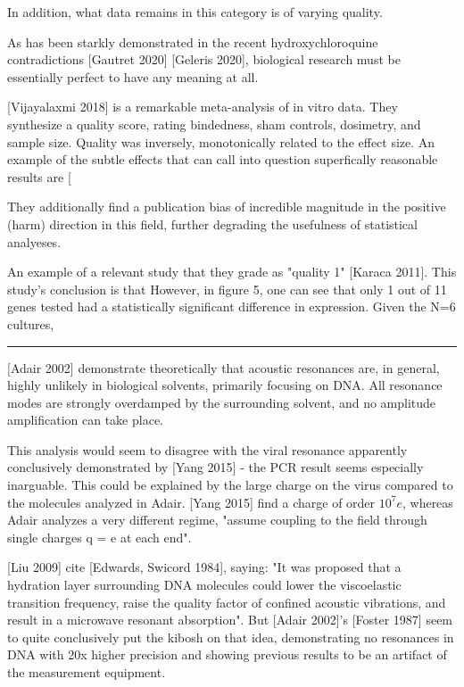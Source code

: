\documentclass[fleqn,10pt]{article}
\begin{document}
\begin{multicols}{1}
In addition, what data remains in this category is of varying quality. 

As has been starkly demonstrated in the recent hydroxychloroquine contradictions [Gautret 2020] [Geleris 2020], biological research must be essentially perfect to have any meaning at all.

[Vijayalaxmi 2018] is a remarkable meta-analysis of in vitro data. They synthesize a quality score, rating bindedness, sham controls, dosimetry, and sample size. Quality was inversely, monotonically related to the effect size. An example of the subtle effects that can call into question superfically reasonable results are [

They additionally find a publication bias of incredible magnitude in the positive (harm) direction in this field, further degrading the usefulness of statistical analyeses.

An example of a relevant study that they grade as "quality 1" [Karaca 2011]. This study's conclusion is that However, in figure 5, one can see that only 1 out of 11 genes tested had a statistically significant difference in expression. Given the N=6 cultures, 

\rule{\linewidth}{0.2pt}

[Adair 2002] demonstrate theoretically that acoustic resonances are, in general, highly unlikely in biological solvents, primarily focusing on DNA. All resonance modes are strongly overdamped by the surrounding solvent, and no amplitude amplification can take place.

This analysis would seem to disagree with the viral resonance apparently conclusively demonstrated by [Yang 2015] - the PCR result seems especially inarguable. This could be explained by the large charge on the virus compared to the molecules analyzed in Adair. [Yang 2015] find a charge of order $10^7 e$, whereas Adair analyzes a very different regime, "assume coupling to the field through single charges q = e at each end".

[Liu 2009] cite [Edwards, Swicord 1984], saying: "It was proposed that a hydration layer surrounding DNA molecules could lower the viscoelastic transition
frequency, raise the quality factor of confined acoustic vibrations, and result in a microwave resonant absorption". But [Adair 2002]'s [Foster 1987] seem to quite conclusively put the kibosh on that idea, demonstrating no resonances in DNA with 20x higher precision and showing previous results to be an artifact of the measurement equipment.


\end{multicols}
\end{document}
